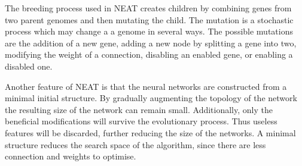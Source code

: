 The breeding process used in NEAT creates children by combining genes from two parent genomes and then mutating the child. The mutation is a stochastic process which may change a a genome in several ways. The possible mutations are the addition of a new gene, adding a new node by splitting a gene into two, modifying the weight of a connection, disabling an enabled gene, or enabling a disabled one.

Another feature of NEAT is that the neural networks are constructed from a minimal initial structure. By gradually augmenting the topology of the network the resulting size of the network can remain small. Additionally, only the beneficial modifications will survive the evolutionary process. Thus useless features will be discarded, further reducing the size of the networks. A minimal structure reduces the search space of the algorithm, since there are less connection and weights to optimise. 





